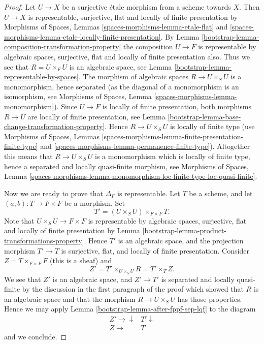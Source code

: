 \begin{proof}

Let $U \to X$ be a surjective \'etale morphism from a scheme towards $X$.
Then $U \to X$ is representable, surjective, flat and
locally of finite presentation by
Morphisms of Spaces,
Lemmas \ref{spaces-morphisms-lemma-etale-flat} and
\ref{spaces-morphisms-lemma-etale-locally-finite-presentation}.
By
Lemma \ref{bootstrap-lemma-composition-transformation-property}
the composition $U \to F$ is representable by algebraic spaces,
surjective, flat and locally of finite presentation also.
Thus we see that $R = U \times_F U$ is an algebraic space, see
Lemma \ref{bootstrap-lemma-representable-by-spaces}.
The morphism of algebraic spaces $R \to U \times_S U$ is
a monomorphism, hence separated (as the diagonal of a monomorphism
is an isomorphism, see
Morphisms of Spaces,
Lemma \ref{spaces-morphisms-lemma-monomorphism}).
Since $U \to F$ is locally of finite presentation, both
morphisms $R \to U$ are locally of finite presentation, see
Lemma \ref{bootstrap-lemma-base-change-transformation-property}.
Hence $R \to U \times_S U$ is locally of finite type (use
Morphisms of Spaces,
Lemmas \ref{spaces-morphisms-lemma-finite-presentation-finite-type} and
\ref{spaces-morphisms-lemma-permanence-finite-type}).
Altogether this means that
$R \to U \times_S U$ is a monomorphism which is locally of finite
type, hence a separated and locally quasi-finite morphism, see
Morphisms of Spaces, Lemma
\ref{spaces-morphisms-lemma-monomorphism-loc-finite-type-loc-quasi-finite}.

\medskip\noindent
Now we are ready to prove that $\Delta_F$ is representable.
Let $T$ be a scheme, and let $(a, b) : T \to F \times F$ be a morphism.
Set
$$
T' = (U \times_S U) \times_{F \times F} T.
$$
Note that $U \times_S U \to F \times F$ is
representable by algebraic spaces, surjective, flat and
locally of finite presentation by
Lemma \ref{bootstrap-lemma-product-transformations-property}.
Hence $T'$ is an algebraic space, and the projection morphism
$T' \to T$ is surjective, flat, and locally of finite presentation.
Consider $Z = T \times_{F \times F} F$ (this is a sheaf) and
$$
Z' = T' \times_{U \times_S U} R
= T' \times_T Z.
$$
We see that $Z'$ is an algebraic space, and
$Z' \to T'$ is separated and locally quasi-finite by the
discussion in the first paragraph of the proof which showed that $R$ is
an algebraic space and that the
morphism $R \to U \times_S U$ has those properties.
Hence we may apply
Lemma \ref{bootstrap-lemma-after-fppf-sep-lqf}
to the diagram
$$
\begin{array}{cc}Z' \longrightarrow\downarrow & T' \downarrow \\ Z \longrightarrow & T\end{array}
$$
and we conclude.
\end{proof}

